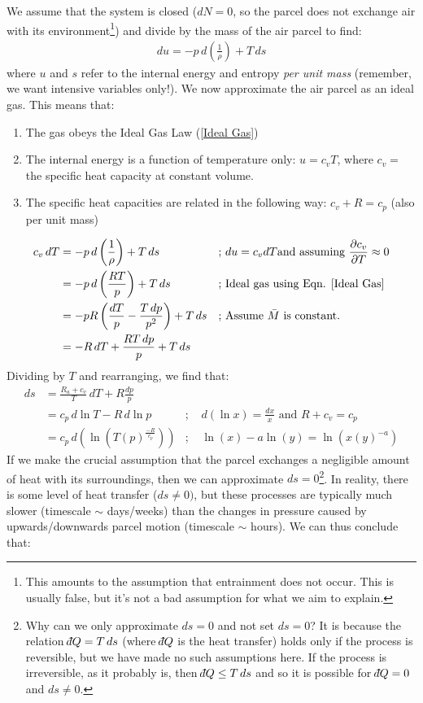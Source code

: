 We assume that the system is closed ($dN=0$, so the parcel does not exchange air with its environment\footnote{This amounts to the assumption that entrainment does not occur. This is usually false, but it's not a bad assumption for what we aim to explain.}) and divide by the mass of the air parcel to find: 
\begin{align*}
    du=-p\,d\left(\frac{1}{\rho}\right)+T\,ds
\end{align*}
where $u$ and $s$ refer to the internal energy and entropy \textit{per unit mass} (remember, we want intensive variables only!). We now approximate the air parcel as an ideal gas. This means that:

\begin{enumerate}
    \item The gas obeys the Ideal Gas Law (\ref{Ideal Gas})
    \item The internal energy is a function of temperature only: $u=c_vT$, where $c_v=$ the specific heat capacity at constant volume.
    \item The specific heat capacities are related in the following way: $c_v+R=c_p$ (also per unit mass)
\end{enumerate}
\begin{align*}
    c_v\,dT&=-p\,d\left(\frac{1}{\rho}\right)+T\,ds
    &\text{; }&du=c_vdT \text{and assuming } \frac{\partial c_v}{\partial T}\approx0
    \\
    &=-p\,d\left(\frac{RT}{p}\right)+T\,ds
    &\text{; }&\text{Ideal gas using Eqn. \ref{Ideal Gas}}
    \\
    &=-pR\left(\frac{dT}{p}-\frac{T\,dp}{p^2}\right)+T\,ds
    &\text{; }&\text{Assume } \bar{M} \text{ is constant.}
    \\
    &=-R\,dT+\frac{RT\,dp}{p}+T\,ds
\end{align*}
Dividing by $T$ and rearranging, we find that:
\begin{align*}
    ds & = \frac{R_a+c_v}{T}\,dT+R\frac{dp}{p}
    \\
     & = c_p\,d\ln T-R\,d\ln p
     &\text{; }& d(\ln x)=\frac{dx}{x}\text{ and } R+c_v=c_p
     \\
     & = c_p\,d\left(\ln \left(T(p)^\frac{-R}{c_p}\right)\right)
     &\text{; }&\ln(x)-a\ln(y)=\ln\left(x(y)^{-a}\right)
\end{align*}
If we make the crucial assumption that the parcel exchanges a negligible amount of heat with its surroundings, then we can approximate $ds=0$\footnote{
    Why can we only approximate $ds=0$ and not set $ds=0$? It is because the relation $\dbar Q=T\,ds$ (where $\dbar Q$ is the heat transfer) holds only if the process is reversible, but we have made no such assumptions here. If the process is irreversible, as it probably is, then $\dbar Q\leq T\,ds$ and so it is possible for $\dbar Q=0$ and $ds\neq 0$.
}. In reality, there is some level of heat transfer ($ds\neq0)$, but these processes are typically much slower (timescale $\sim$ days/weeks) than the changes in pressure caused by upwards/downwards parcel motion (timescale $\sim$ hours). We can thus conclude that:
